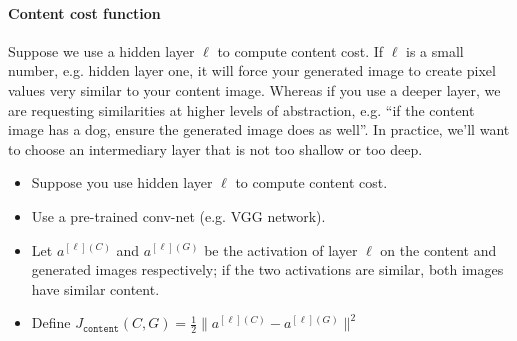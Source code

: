 \documentclass[12pt]{article}
\begin{document}
\paragraph{Content cost function} Suppose we use a hidden layer $\ell$ to compute content cost. If $\ell$ is a small number, e.g. hidden layer one, it will force your generated image to create pixel values very similar to your content image. Whereas if you use a deeper layer, we are requesting similarities at higher levels of abstraction, e.g. ``if the content image has a dog, ensure the generated image does as well''. In practice, we'll want to choose an intermediary layer that is not too shallow or too deep.
\begin{itemize}
\item Suppose you use hidden layer $\ell$ to compute content cost.
\item Use a pre-trained conv-net (e.g. VGG network).
\item Let $a^{[\ell](C)}$ and $a^{[\ell](G)}$ be the activation of layer $\ell$   on the content and generated images respectively; if the two activations are similar, both images have similar content.
\item Define $J_{\texttt{content}}(C,G) = \frac{1}{2} \|a^{[\ell](C)} - a^{[\ell](G)}\|^2$
\end{itemize}
\end{document}

